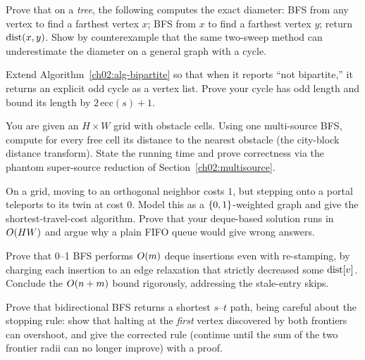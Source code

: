 \begin{exercise}
Prove that on a \emph{tree}, the following computes the exact diameter: BFS from
any vertex to find a farthest vertex $x$; BFS from $x$ to find a farthest vertex
$y$; return $\operatorname{dist}(x,y)$. Show by counterexample that the same two-sweep method
can underestimate the diameter on a general graph with a cycle.
\end{exercise}

\begin{exercise}
Extend Algorithm~\ref{ch02:alg-bipartite} so that when it reports ``not
bipartite,'' it returns an explicit odd cycle as a vertex list. Prove your cycle
has odd length and bound its length by $2\,\mathrm{ecc}(s)+1$.
\end{exercise}

\begin{exercise}
You are given an $H\times W$ grid with obstacle cells. Using one multi-source BFS,
compute for every free cell its distance to the nearest obstacle (the city-block
distance transform). State the running time and prove correctness via the
phantom super-source reduction of Section~\ref{ch02:multisource}.
\end{exercise}

\begin{exercise}
On a grid, moving to an orthogonal neighbor costs $1$, but stepping onto a portal
teleports to its twin at cost $0$. Model this as a $\{0,1\}$-weighted graph and
give the shortest-travel-cost algorithm. Prove that your deque-based solution runs
in $O(HW)$ and argue why a plain FIFO queue would give wrong answers.
\end{exercise}

\begin{exercise}
Prove that 0--1 BFS performs $O(m)$ deque insertions even with re-stamping, by
charging each insertion to an edge relaxation that strictly decreased some
$\operatorname{dist}[v]$. Conclude the $O(n+m)$ bound rigorously, addressing the stale-entry
skips.
\end{exercise}

\begin{exercise}
Prove that bidirectional BFS returns a shortest $s$--$t$ path, being careful about
the stopping rule: show that halting at the \emph{first} vertex discovered by both
frontiers can overshoot, and give the corrected rule (continue until the sum of
the two frontier radii can no longer improve) with a proof.
\end{exercise}

